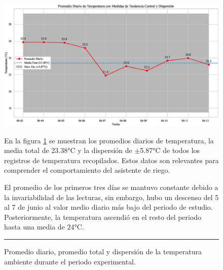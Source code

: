 \documentclass[pdflatex,sn-mathphys-num]{sn-jnl}%
\theoremstyle{thmstyleone}%
\theoremstyle{thmstyletwo}%
\theoremstyle{thmstylethree}%
\begin{document}
\begin{figure}[!ht]
    \centering
    \includegraphics[width=1\textwidth]{assets/temperatura_promedio_y_estadisticas.eps}
    \caption{Promedio diario, promedio total y dispersión de la temperatura ambiente durante el periodo experimental.}
    \label{fig:temperatura_desviacion}

    \vspace{0.4cm}

    \noindent
    \begin{minipage}[t]{0.45\textwidth}
        \justifying
        En la figura \ref{fig:temperatura_desviacion} se muestran los promedios diarios de temperatura, la media total de 23.38°C y la dispersión de $\pm$5.87°C de todos los registros de temperatura recopilados. Estos datos son relevantes para comprender el comportamiento del asistente de riego.
	\end{minipage}%
    \hfill
    \begin{minipage}[t]{0.45\textwidth}
        \justifying
        El promedio de los primeros tres días se mantuvo constante debido a la invariabilidad de las lecturas, sin embargo, hubo un descenso del 5 al 7 de junio al valor medio diario más bajo del periodo de estudio. Posteriormente, la temperatura ascendió en el resto del periodo hasta una media de 24°C.

\end{minipage}

    \vspace{0.5cm}
    \hrule
\end{figure}
\end{document}
